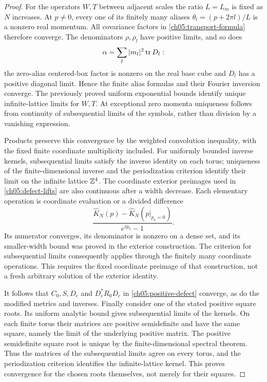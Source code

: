 \begin{proof}
For the operators $W,T$ between adjacent scales the ratio $L=L_m$ is fixed as $N$ increases.
At $p\ne0$, every one of its finitely many aliases
$\theta_l=(p+2\pi l)/L$ is a nonzero real momentum. All covariance
factors in \eqref{ch05:transport-formula} therefore converge.
The denominators $\rho,\rho_l$ have positive limits, and so does
\[
 \alpha=\sum_l |m_l|^2\operatorname{tr} D_l:
\]
the zero-alias centered-box factor is nonzero on the real base cube and
$D_l$ has a positive diagonal limit. Hence the finite alias formulas
and their Fourier inversion converge. The previously proved
uniform exponential bounds identify unique infinite-lattice limits for $W,T$.
At exceptional zero momenta uniqueness follows from continuity of
subsequential limits of the symbols, rather than division by a vanishing expression.

Products preserve this convergence by the weighted convolution
inequality, with the fixed finite coordinate multiplicity included.
For uniformly bounded inverse kernels, subsequential limits satisfy the inverse
identity on each torus; uniqueness of the finite-dimensional inverse
and the periodization criterion identify their limit on the infinite lattice $\mathbb Z^4$.
The coordinate exterior preimages used in \eqref{ch05:defect-lifts} are
also continuous after a width decrease. Each elementary operation is
coordinate evaluation or a divided difference
\[
 \frac{\widehat K_N(p)-\widehat K_N(p|_{p_a=0})}{e^{ip_a}-1}.
\]
Its numerator converges, its denominator is nonzero on a dense set,
and its smaller-width bound was proved in the exterior construction.
The criterion for subsequential limits consequently applies through the finitely many
coordinate operations. This requires the fixed coordinate preimage of that
construction, not a fresh arbitrary solution of the exterior identity.

It follows that $C_0,S,D_c$ and $D_c^*R_0D_c$ in
\eqref{ch05:positive-defect} converge, as do the modified metrics and
inverses. Finally consider one of the stated positive square roots.
Its uniform analytic bound gives subsequential limits of the kernels. On each finite torus
their matrices are positive semidefinite and have the same square,
namely the limit of the underlying positive matrix. The positive
semidefinite square root is unique by the finite-dimensional spectral
theorem. Thus the matrices of the subsequential limits agree on every torus, and the
periodization criterion identifies the infinite-lattice kernel. This proves convergence for the
chosen roots themselves, not merely for their squares.
\end{proof}

